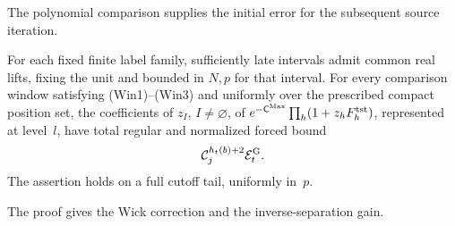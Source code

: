 The polynomial comparison supplies the initial error for the subsequent source iteration.
\begin{lemma}\label{lem:E-source-polynomial}
For each fixed finite label family, sufficiently late intervals admit common real lifts, fixing the unit and bounded in $N,p$ for that interval. For every comparison window satisfying (Win1)--(Win3) and uniformly over the prescribed compact position set, the coefficients of $z_I$, $I\ne\varnothing$, of $e^{-\mathsf C^{\rm Max}}\prod_h(1+z_hF^{\rm tst}_h)$, represented at level~$l$, have total regular and normalized forced bound
\begin{equation*}
 \mathcal C_j^{h_t(b)+2}\mathcal E_t^{\rm G}.
\end{equation*}
The assertion holds on a full cutoff tail, uniformly in~$p$.
\end{lemma}
The proof gives the Wick correction and the inverse-separation gain.
